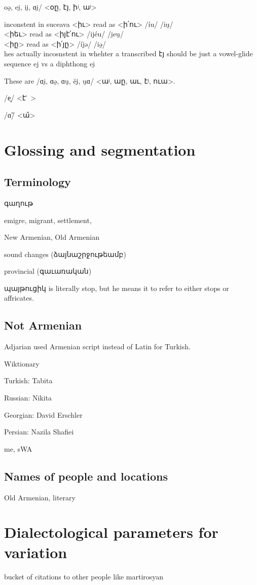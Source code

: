 oə̯, ei̯, ii̯, ɑi̯/ <օը, էյ, իʲ, աʲ>

inconstent in suceava         <իւ>   read as <ի՛ու> /\'iu/   /iu̯/ \\ 
<իեւ>   read as <իյէ՛ու> /ij\'eu/  /i̯eu̯/ \\
<իը>   read as  <ի՛յը> /\'ijə/  /iə̯/ \\ 


hes actually incosnstent in whehter a transcribed էյ should be just a vowel-glide sequence ej vs a diphthong ei̯ 


These are /ɑi̯,  ɑə̯, ɑu̯,  ĕi̯, u̯ɑ/  <աʲ,   աը, աւ, էʲ,  ուա>.


/e̞/ <է ̀ >

/ɑ̃/ <ա̄>
\section{Glossing and segmentation}
\subsection{Terminology}

գաղութ

emigre, migrant, settlement, 


New Armenian, Old Armenian


sound changes (ձայնաշրջութեամբ) 

provincial (գաւառական)


պայթուցիկ is literally stop, but he means it to refer to either stops or affricates. 





\subsection{Not Armenian}
Adjarian used Armenian script instead of Latin for Turkish. 


Wiktionary

Turkish: Tabita

Russian: Nikita

Georgian: David Erschler

Persian: Nazila Shafiei

me, sWA

\subsection{Names of people and locations}


Old Armenian, literary
\section{Dialectological parameters for variation}
bucket of citations to other people like martirosyan

